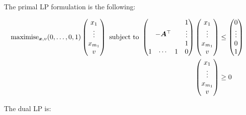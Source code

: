 The primal LP formulation is the following:

\begin{equation}
	\begin{split}
		\text{maximise}_{\vect{x},v}
		(0,\ldots,0,1) \begin{pmatrix}
			x_1 \\
			\vdots \\
			x_{m_1} \\
			v
		\end{pmatrix}
		\text{ subject to }
		\begin{pmatrix}
			& & & 1 \\
			& & & \vdots  \\
			\multicolumn{3}{c}
			{\raisebox{\dimexpr\normalbaselineskip+.7\ht\strutbox-.5\height}[0pt][0pt]
			{{$-\vect{A}^\top$}}} & 1 \\
			1 & \cdots & 1 & 0
		\end{pmatrix} \begin{pmatrix}
			x_1 \\
			\vdots \\
			x_{m_1} \\
			v
		\end{pmatrix} & \le \begin{pmatrix}
			0 \\
			\vdots \\
			0 \\
			1
		\end{pmatrix} \\
		\begin{pmatrix}
			x_1 \\
			\vdots \\
			x_{m_1} \\
			v
		\end{pmatrix} & \ge 0
	\end{split} 
\end{equation}

The dual LP is:

